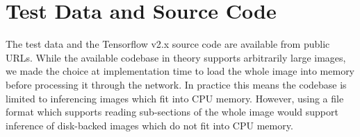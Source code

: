 \documentclass[runningheads]{llncs}
\newif\ifcamera
\begin{document}



\section{Test Data and Source Code}
The test data and the Tensorflow v2.x source code are available from public URLs\ifcamera\footnote{
\url{https://isg.nist.gov/deepzoomweb/data/stemcellpluripotency} 
\url{https://github.com/usnistgov/semantic-segmentation-unet/tree/ooc-inference}.}\fi.
While the available codebase in theory supports arbitrarily large images, we made the choice at implementation time to load the whole image into memory before processing it through the network. In practice this means the codebase is limited to inferencing images which fit into CPU memory. However, using a file format which supports reading sub-sections of the whole image would support inference of disk-backed images which do not fit into CPU memory. 

\ifcamera
\section{Disclaimer}

Commercial products are identified in this document in order to specify the experimental procedure adequately. Such identification is not intended to imply recommendation or endorsement by NIST, nor is it intended to imply that the products identified are necessarily the best available for the purpose. Analysis performed [in part] on the NIST Enki HPC cluster. Contribution of U.S. government not subject to copyright.
\fi

\clearpage
%
%
{\fontsize{9.0pt}{10.0pt} 
\selectfont



\clearpage

}
\end{document}
